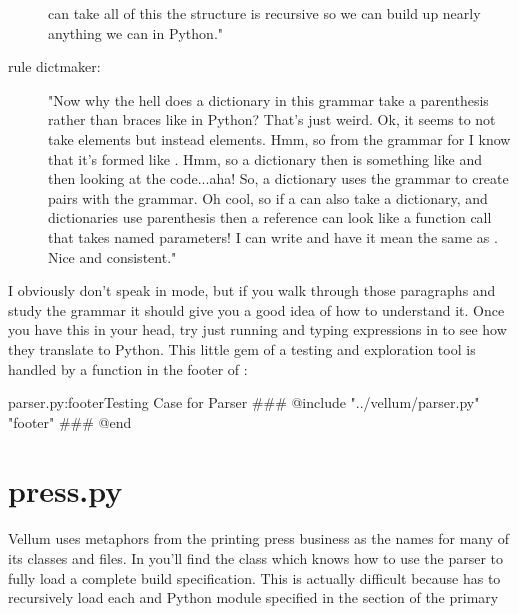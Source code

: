 \begin{description}
     can take all of this the structure is recursive so we can build
    up nearly anything we can in Python."
\item[rule dictmaker:] "Now why the hell does a dictionary in this grammar take a
    parenthesis rather than braces like in Python?  That's just weird.  Ok, it
    seems to not take  elements but instead 
    elements.  Hmm, so from the grammar for  I know that it's
    formed like .  Hmm, so a dictionary then is something 
    like  and then looking at the
    code...aha!  So, a dictionary uses the  grammar to create
     pairs with the  grammar.  Oh cool, so if a
     can also take a dictionary, and dictionaries use
    parenthesis then a reference can look like a function call that takes named
    parameters!  I can write  and have it mean the same as .  Nice and consistent."
\end{description}

I obviously don't speak in  mode, but if you walk through
those paragraphs and study the grammar it should give you a good idea of how to
understand it.  Once you have this in your head, try just running  and typing expressions in to see how they translate to
Python.  This little gem of a testing and exploration tool is handled by a
function in the footer of :

\begin{code}{parser.py:footer}{Testing Case for Parser}
### @include "../vellum/parser.py" "footer"
### @end
\end{code}


\section{press.py}

Vellum uses metaphors from the printing press business as the names for many of
its classes and files.  In  you'll find the  class
which knows how to use the parser to fully load a complete build specification.
This is actually difficult because  has to recursively load each
 and Python module specified in the  section of the
primary 

